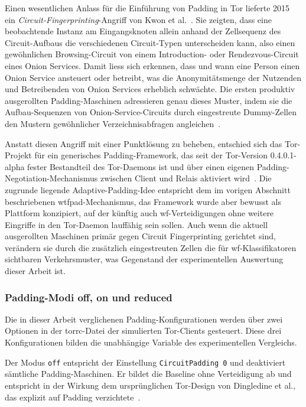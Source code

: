 Einen wesentlichen Anlass für die Einführung von Padding in Tor lieferte 2015 ein \emph{Circuit-Fingerprinting}-Angriff von Kwon et al.~\cite{kwon2015circuit}.
Sie zeigten, dass eine beobachtende Instanz am Eingangsknoten allein anhand der Zellsequenz des Circuit-Aufbaus die verschiedenen Circuit-Typen unterscheiden kann, also einen gewöhnlichen Browsing-Circuit von einem Introduction- oder Rendezvous-Circuit eines Onion Services.
Damit liess sich erkennen, dass und wann eine Person einen Onion Service ansteuert oder betreibt, was die Anonymitätsmenge der Nutzenden und Betreibenden von Onion Services erheblich schwächte.
Die ersten produktiv ausgerollten Padding-Maschinen adressieren genau dieses Muster, indem sie die Aufbau-Sequenzen von Onion-Service-Circuits durch eingestreute Dummy-Zellen den Mustern gewöhnlicher Verzeichnisabfragen angleichen~\cite{kadianakis2021tor}.

Anstatt diesen Angriff mit einer Punktlösung zu beheben, entschied sich das Tor-Projekt für ein generisches Padding-Framework, das seit der Tor-Version 0.4.0.1-alpha fester Bestandteil des Tor-Daemons ist und über einen eigenen Padding-Negotiation-Mechanismus zwischen Client und Relais aktiviert wird~\cite{kadianakis2021tor}.
Die zugrunde liegende Adaptive-Padding-Idee entspricht dem im vorigen Abschnitt beschriebenen \gls{wtfpad}-Mechanismus, das Framework wurde aber bewusst als Plattform konzipiert, auf der künftig auch \gls{wf}-Verteidigungen ohne weitere Eingriffe in den Tor-Daemon lauffähig sein sollen.
Auch wenn die aktuell ausgerollten Maschinen primär gegen Circuit Fingerprinting gerichtet sind, verändern sie durch die zusätzlich eingestreuten Zellen die für \gls{wf}-Klassifikatoren sichtbaren Verkehrsmuster, was Gegenstand der experimentellen Auswertung dieser Arbeit ist.

\subsubsection{Padding-Modi off, on und reduced}

Die in dieser Arbeit verglichenen Padding-Konfigurationen werden über zwei Optionen in der torrc-Datei der simulierten Tor-Clients gesteuert.
Diese drei Konfigurationen bilden die unabhängige Variable des experimentellen Vergleichs.

Der Modus \texttt{off} entspricht der Einstellung \texttt{CircuitPadding 0} und deaktiviert sämtliche Padding-Maschinen.
Er bildet die Baseline ohne Verteidigung ab und entspricht in der Wirkung dem ursprünglichen Tor-Design von Dingledine et al., das explizit auf Padding verzichtete~\cite{dingledine2004tor}.

